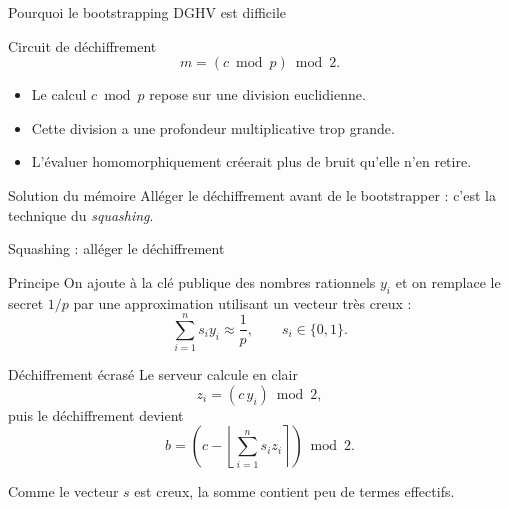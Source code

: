 \documentclass[10pt,aspectratio=169]{beamer}
\begin{document}
\begin{frame}{Pourquoi le bootstrapping DGHV est difficile}
  \begin{block}{Circuit de déchiffrement}
    \[
      m=(c\bmod p)\bmod 2.
    \]
  \end{block}

  \begin{itemize}
    \item Le calcul $c\bmod p$ repose sur une division euclidienne.
    \item Cette division a une profondeur multiplicative trop grande.
    \item L'évaluer homomorphiquement créerait plus de bruit qu'elle n'en retire.
  \end{itemize}

  \begin{exampleblock}{Solution du mémoire}
    Alléger le déchiffrement avant de le bootstrapper : c'est la technique du \textit{squashing}.
  \end{exampleblock}
\end{frame}

\begin{frame}{Squashing : alléger le déchiffrement}
  \small
  \begin{block}{Principe}
    On ajoute à la clé publique des nombres rationnels $y_i$ et on remplace le secret $1/p$ par une approximation utilisant un vecteur très creux :
    \[
      \sum_{i=1}^n s_i y_i \approx \frac{1}{p},
      \qquad
      s_i\in\{0,1\}.
    \]
  \end{block}

  \begin{block}{Déchiffrement écrasé}
    Le serveur calcule en clair
    \[
      z_i=(c\,y_i)\bmod 2,
    \]
    puis le déchiffrement devient
    \[
      b=
      \left(
      c-\left\lfloor\sum_{i=1}^n s_i z_i\right\rceil
      \right)\bmod 2.
    \]
  \end{block}

  Comme le vecteur $s$ est creux, la somme contient peu de termes effectifs.
\end{frame}
\end{document}
